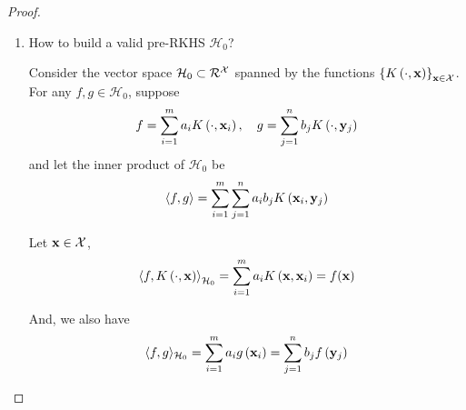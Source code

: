 \begin{proof}
	\begin{enumerate}
		\item How to build a valid pre-RKHS \(\mathcal{H}_{0}\)?

		      Consider the vector space \(\mathcal{H}_{0}\subset\mathcal{R}^{\mathcal{X}}\) spanned by the functions \(\left\{K\left(\cdot,\mathbf{x}\right)\right\}_{\mathbf{x}\in\mathcal{X}}\). For any \(f,g\in\mathcal{H}_{0}\), suppose
		      \begin{equation*}
			      f=\sum_{i=1}^{m}a_{i}K\left(\cdot,\mathbf{x}_{i}\right),\quad g=\sum_{j=1}^{n}b_{j}K\left(\cdot,\mathbf{y}_{j}\right)
		      \end{equation*}
		      and let the inner product of \(\mathcal{H}_{0}\) be
		      \begin{equation}
			      \left\langle f,g\right\rangle=\sum_{i=1}^{m}\sum_{j=1}^{n}a_{i}b_{j}K\left(\mathbf{x}_{i},\mathbf{y}_{j}\right)
			      \label{eq:definition-pre-rkhs-inner-product}
		      \end{equation}

		      Let \(\mathbf{x}\in\mathcal{X}\),
		      \begin{equation*}
			      \left\langle f,K\left(\cdot,\mathbf{x}\right)\right\rangle_{\mathcal{H}_{0}}=\sum_{i=1}^{m}a_{i} K\left(\mathbf{x},\mathbf{x}_{i}\right)=f(\mathbf{x})
			      \label{eq:reproducing-kernel}
		      \end{equation*}

		      And, we also have
		      \begin{equation*}
			      \langle f, g\rangle_{\mathcal{H}_{0}}=\sum_{i=1}^{m} a_{i} g\left(\mathbf{x}_{i}\right)=\sum_{j=1}^{n} b_{j} f\left(\mathbf{y}_{j}\right)
		      \end{equation*}


\end{enumerate}
\end{proof}
